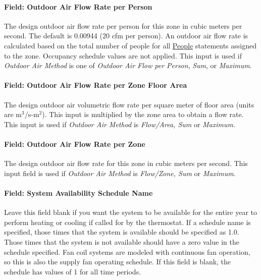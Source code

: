 \paragraph{Field: Outdoor Air Flow Rate per Person}\label{field-outdoor-air-flow-rate-per-person-2}

The design outdoor air flow rate per person for this zone in cubic meters per second. The default is 0.00944 (20 cfm per person). An outdoor air flow rate is calculated based on the total number of people for all \hyperref[people]{People} statements assigned to the zone. Occupancy schedule values are not applied. This input is used if \emph{Outdoor Air Method} is one of \emph{Outdoor Air Flow per Person}, \emph{Sum}, or \emph{Maximum}.

\paragraph{Field: Outdoor Air Flow Rate per Zone Floor Area}\label{field-outdoor-air-flow-rate-per-zone-floor-area-2}

The design outdoor air volumetric flow rate per square meter of floor area (units are m\(^{3}\)/s-m\(^{2}\)). This input is multiplied by the zone area to obtain a flow rate. This input is used if \emph{Outdoor Air Method} is \emph{Flow/Area, Sum} or \emph{Maximum}.

\paragraph{Field: Outdoor Air Flow Rate per Zone}\label{field-outdoor-air-flow-rate-per-zone-2}

The design outdoor air flow rate for this zone in cubic meters per second. This input field is used if \emph{Outdoor Air Method} is \emph{Flow/Zone, Sum} or \emph{Maximum}.

\paragraph{Field: System Availability Schedule Name}\label{field-system-availability-schedule-name-1}

Leave this field blank if you want the system to be available for the entire year to perform heating or cooling if called for by the thermostat. If a schedule name is specified, those times that the system is available should be specified as 1.0. Those times that the system is not available should have a zero value in the schedule specified. Fan coil systems are modeled with continuous fan operation, so this is also the supply fan operating schedule. If this field is blank, the schedule has values of 1 for all time periods.

